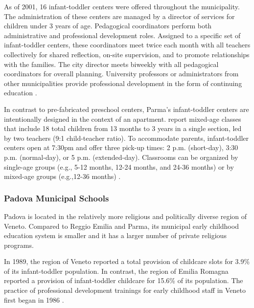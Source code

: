 As of 2001, 16 infant-toddler centers were offered throughout the municipality. The administration of these centers are managed by a director of services for children under 3 years of age. Pedagogical coordinators perform both administrative and professional development roles. Assigned to a specific set of infant-toddler centers, these coordinators meet twice each month with all teachers collectively for shared reflection, on-site supervision, and to promote relationships with the families. The city director meets biweekly with all pedagogical coordinators for overall planning. University professors or administrators from other municipalities provide professional development in the form of continuing education \citep{Terzi-Cantarelli_2001_Parma}.

In contrast to pre-fabricated preschool centers, Parma's infant-toddler centers are intentionally designed in the context of an apartment. \citet{Terzi-Cantarelli_2001_Parma} report mixed-age classes that include 18 total children from 13 months to 3 years in a single section, led by two teachers (9:1 child-teacher ratio). To accommodate parents, infant-toddler centers open at 7:30pm and offer three pick-up times: 2 p.m. (short-day), 3:30 p.m. (normal-day), or 5 p.m. (extended-day). Classrooms can be organized by single-age groups (e.g., 5-12 months, 12-24 months, and 24-36 months) or by mixed-age groups (e.g.,12-36 months) \citep{Majorano-etal_2009_CC-in-P}.

\subsubsection{Padova Municipal Schools}
Padova is located in the relatively more religious and politically diverse region of Veneto. Compared to Reggio Emilia and Parma, its municipal early childhood education system is smaller and it has a larger number of private religious programs. 

In 1989, the region of Veneto reported a total provision of childcare slots for 3.9\% of its infant-toddler population. In contrast, the region of Emilia Romagna reported a provision of infant-toddler childcare for 15.6\% of its population. The practice of professional development trainings for early childhood staff in Veneto first began in 1986 \citep{Becchi-Ferrari_1990_Pub-Inf-Centres-Italy}.

